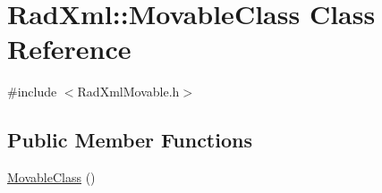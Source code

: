 \hypertarget{class_rad_xml_1_1_movable_class}{\section{Rad\-Xml\-:\-:Movable\-Class Class Reference}
\label{class_rad_xml_1_1_movable_class}
}


{\ttfamily \#include $<$Rad\-Xml\-Movable.\-h$>$}

\subsection*{Public Member Functions}
\begin{DoxyCompactItemize}
\item 
\hyperlink{class_rad_xml_1_1_movable_class_a8babbedde157c655da49c56e684f0669}{Movable\-Class} ()
\end{DoxyCompactItemize}
